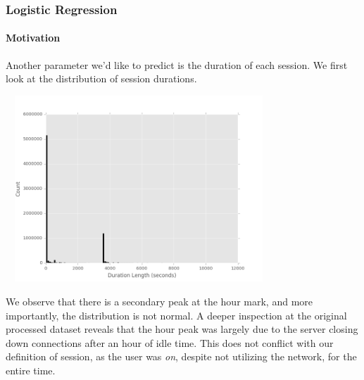 \documentclass[]{article}
\newenvironment{Figure}
  {\par\medskip\noindent\minipage{\linewidth}}
  {\endminipage\par\medskip}
\begin{document}







\subsubsection{Logistic Regression}
\paragraph{Motivation}
Another parameter we'd like to predict is the duration of each session. We first look at the distribution of session durations.

\begin{Figure}
 \centering
 \includegraphics[height = 7cm, width =10cm]{durationDistribution.png}
\end{Figure}

We observe that there is a secondary peak at the hour mark, and more importantly, the distribution is not normal. A deeper inspection at the original processed dataset reveals that the hour peak was largely due to the server closing down connections after an hour of idle time. This does not conflict with our definition of session, as the user was \textit{on}, despite not utilizing the network, for the entire time.
\end{document}
